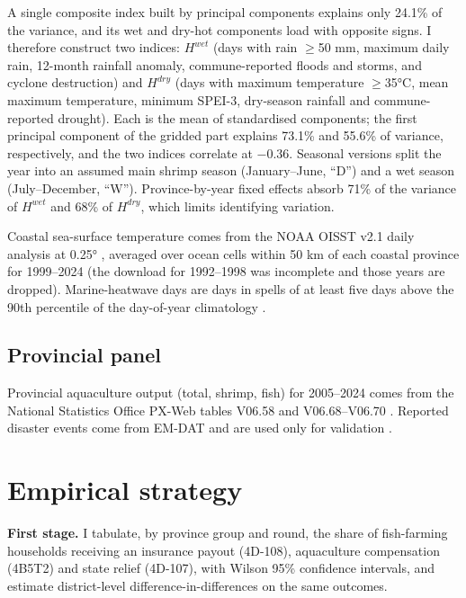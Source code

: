 \documentclass[11pt,a4paper]{article}
\begin{document}
A single composite index built by principal components explains only 24.1\% of the variance, and its wet and dry-hot components load with opposite signs. I therefore construct two indices: $H^{wet}$ (days with rain $\geq$50 mm, maximum daily rain, 12-month rainfall anomaly, commune-reported floods and storms, and cyclone destruction) and $H^{dry}$ (days with maximum temperature $\geq$35°C, mean maximum temperature, minimum SPEI-3, dry-season rainfall and commune-reported drought). Each is the mean of standardised components; the first principal component of the gridded part explains 73.1\% and 55.6\% of variance, respectively, and the two indices correlate at $-0.36$. Seasonal versions split the year into an assumed main shrimp season (January--June, ``D'') and a wet season (July--December, ``W''). Province-by-year fixed effects absorb 71\% of the variance of $H^{wet}$ and 68\% of $H^{dry}$, which limits identifying variation.

Coastal sea-surface temperature comes from the NOAA OISST v2.1 daily analysis at 0.25° \parencite{huang2021oisst}, averaged over ocean cells within 50 km of each coastal province for 1999--2024 (the download for 1992--1998 was incomplete and those years are dropped). Marine-heatwave days are days in spells of at least five days above the 90th percentile of the day-of-year climatology \parencite{hobday2016}.

\subsection{Provincial panel}

Provincial aquaculture output (total, shrimp, fish) for 2005--2024 comes from the National Statistics Office PX-Web tables V06.58 and V06.68--V06.70 \parencite{nso_pxweb}. Reported disaster events come from EM-DAT and are used only for validation \parencite{emdat}.

\section{Empirical strategy}
\label{sec:strategy}

\textbf{First stage.} I tabulate, by province group and round, the share of fish-farming households receiving an insurance payout (4D-108), aquaculture compensation (4B5T2) and state relief (4D-107), with Wilson 95\% confidence intervals, and estimate district-level difference-in-differences on the same outcomes.
\end{document}
